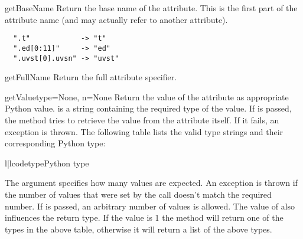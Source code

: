 \begin{methoddesc}{getBaseName}{}
Return the base name of the attribute. This is the first part of the
attribute name (and may actually refer to another attribute).

\begin{verbatim}
  ".t"            -> "t"
  ".ed[0:11]"     -> "ed"
  ".uvst[0].uvsn" -> "uvst"
\end{verbatim}
\end{methoddesc}

\begin{methoddesc}{getFullName}{}
Return the full attribute specifier.
\end{methoddesc}

\begin{methoddesc}{getValue}{type=None, n=None}
Return the value of the attribute as appropriate Python value.
 is a string containing the required type of the value.
If  is passed, the method tries to retrieve the value from
the attribute itself. If it fails, an exception is thrown. The following
table lists the valid type strings and their corresponding Python type:

\begin{tableii}{l|l}{code}{type}{Python type}
\end{tableii}

The argument  specifies how many values are expected. An exception
is thrown if the number of values that were set by the  call
doesn't match the required number. If  is passed, an arbitrary
number of values is allowed. The value of  also influences the
return type. If the value is 1 the method will return one of the types
in the above table, otherwise it will return a list of the above types.

\end{methoddesc}


